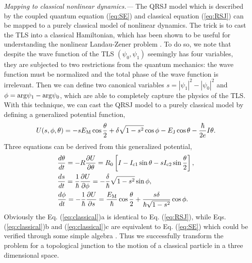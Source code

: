 \documentclass[aps,prl,twocolumn,showpacs,showpacs,10pt,superscriptaddress]{revtex4-1}
\begin{document}
{\it Mapping to classical nonlinear dynamics.---}
The QRSJ model which is described by the coupled quantum equation (\ref{eq:SE}) and classical equation (\ref{eq:RSJ}) can be mapped to a purely classical model of nonlinear dynamics. The trick is to cast the TLS into a classical Hamiltonian, which has been shown to be useful for understanding the nonlinear Landau-Zener problem \cite{Liu02,Liu03}. To do so, we note that despite the wave function of the TLS $(\psi_0,\psi_1)$ seemingly has four variables, they are subjected to two restrictions from the quantum mechanics: the wave function must be normalized and the total phase of the wave function is irrelevant. Then we can define two canonical variables $s = |\psi_1|^2 - |\psi_0|^2$ and $\phi = {\rm arg}\psi_1 - {\rm arg}\psi_0$, which are able to completely capture the physics of the TLS. With this technique, we can cast the QRSJ model to a purely classical model by defining a generalized potential function,
\begin{equation}
U (s,\phi,\theta)= -s E_{\rm M}  \cos \frac{\theta}{2} + \delta \sqrt{1-s^2} \cos \phi  -E_{\rm J} \cos \theta - \frac{\hbar}{2e} I \theta.
\end{equation}
Three equations can be derived from this generalized potential,
\begin{subequations}\label{eq:classical}
\begin{align}
&\frac{d\theta}{dt} = - R \frac {\partial U}{\partial \theta}  =  R_0 \left[I - I_{\rm c1}\sin{\theta} - s I_{\rm c2}  \sin{\frac{\theta}{2}}\right] ,
\\
&\frac{ds}{dt} = \frac{1}{\hbar} \frac {\partial U}{\partial \phi} = -\frac{\delta}{\hbar} \sqrt{1-s^2} \sin \phi ,
\\
& \frac{d\phi}{dt} = - \frac{1}{\hbar} \frac{\partial U}{ \partial s} =  \frac{E_{\rm M}}{\hbar}\cos \frac{\theta}{2} + \frac{s \delta }{\hbar \sqrt{1-s^2}}  \cos \phi.
\end{align}
\end{subequations}
Obviously the Eq. (\ref{eq:classical})a is identical to Eq. (\ref{eq:RSJ}), while Eqs. (\ref{eq:classical})b and (\ref{eq:classical})c are equivalent to Eq. (\ref{eq:SE}) which could be verified through some simple algebra \cite{supplement}. Thus we successfully transform the problem for a topological junction to the motion of a classical particle in a three dimensional space.
\end{document}

